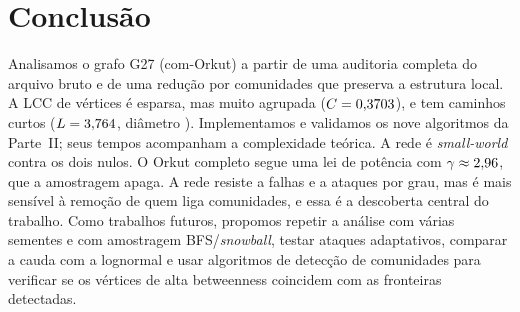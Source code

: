 \IfFileExists{webmedia.cls}{\documentclass[sigconf]{webmedia}}{\documentclass[sigconf]{acmart}}
\begin{document}
\section{Conclusão}
Analisamos o grafo G27 (com-Orkut) a partir de uma auditoria completa do arquivo bruto e de uma redução por comunidades que preserva a estrutura local. A LCC de \nV{} vértices é esparsa, mas muito agrupada ($C = 0{,}3703$), e tem caminhos curtos ($L = 3{,}764$, diâmetro \diametro). Implementamos e validamos os nove algoritmos da Parte~II; seus tempos acompanham a complexidade teórica. A rede é \emph{small-world} contra os dois nulos. O Orkut completo segue uma lei de potência com $\gamma \approx 2{,}96$, que a amostragem apaga. A rede resiste a falhas e a ataques por grau, mas é mais sensível à remoção de quem liga comunidades, e essa é a descoberta central do trabalho. Como trabalhos futuros, propomos repetir a análise com várias sementes e com amostragem BFS/\emph{snowball}, testar ataques adaptativos, comparar a cauda com a lognormal e usar algoritmos de detecção de comunidades para verificar se os vértices de alta betweenness coincidem com as fronteiras detectadas.



\end{document}
